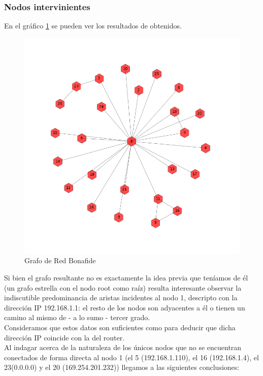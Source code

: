 \subsubsection{Nodos intervinientes}

En el gr\'afico \ref{bonafideGraph} se pueden ver los resultados de obtenidos.

\begin{figure}[h!]
    \centering                                                       
    \includegraphics[width=400pt]{img/bonafideGraph.png}
    \caption{Grafo de Red Bonafide}
    \label{bonafideGraph}
\end{figure}
Si bien el grafo resultante no es exactamente la idea previa que ten\'iamos de \'el (un grafo estrella con el nodo root como ra\'iz) resulta interesante observar la indiscutible predominancia de aristas incidentes al nodo 1, descripto con la direcci\'on IP 192.168.1.1: el resto de los nodos son adyacentes a \'el o tienen un camino al mismo de - a lo sumo - tercer grado.\\
Consideramos que estos datos son suficientes como para deducir que dicha direcci\'on IP coincide con la del router.\\
Al indagar acerca de la naturaleza de los \'unicos nodos que no se encuentran conectados de forma directa al nodo 1 (el 5 (192.168.1.110), el 16 (192.168.1.4), el 23(0.0.0.0) y el 20 (169.254.201.232)) llegamos a las siguientes conclusiones: \\
